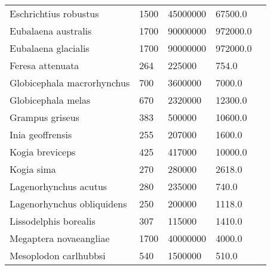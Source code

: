 \begin{longtable}{|p{2.1in}p{0.5in}p{1.0in}p{1.0in}p{1.5in}|}
       Eschrichtius robustus  &         1500 &    45000000  &      67500.0   &                                  \citet{tomilin1967} \\
         Eubalaena australis  &         1700 &    90000000  &     972000.0   &                                     \citet{best2001} \\
         Eubalaena glacialis  &         1700 &    90000000  &     972000.0   &                                     \citet{best2001} \\
            Feresa attenuata  &          264 &      225000  &        754.0   &                                \citet{jefferson2008} \\
  Globicephala macrorhynchus  &          700 &     3600000  &       7000.0   &                                \citet{jefferson2008} \\
          Globicephala melas  &          670 &     2320000  &      12300.0   &                  \citet{jefferson2008,desportes1993} \\
             Grampus griseus  &          383 &      500000  &      10600.0   &                     \citet{jefferson2008,perrin1984} \\
            Inia geoffrensis  &          255 &      207000  &       1600.0   &                       \citet{jefferson2008,best1989} \\
             Kogia breviceps  &          425 &      417000  &      10000.0   &   \citet{bloodworth2008,caldwell1971,tomilin1967,ruiz1993} \\
                  Kogia sima  &          270 &      280000  &       2618.0   &                                     \citet{ross1979} \\
       Lagenorhynchus acutus  &          280 &      235000  &        740.0   &                                \citet{jefferson2008} \\
  Lagenorhynchus obliquidens  &          250 &      200000  &       1118.0   &                                 \citet{harrison1972} \\
       Lissodelphis borealis  &          307 &      115000  &       1410.0   &                                 \citet{harrison1972} \\
      Megaptera novaeangliae  &         1700 &    40000000  &       4000.0   &                                \citet{jefferson2008} \\
       Mesoplodon carlhubbsi  &          540 &     1500000  &        510.0   &                       \citet{jefferson2008,mead1982} \\

\end{longtable}
